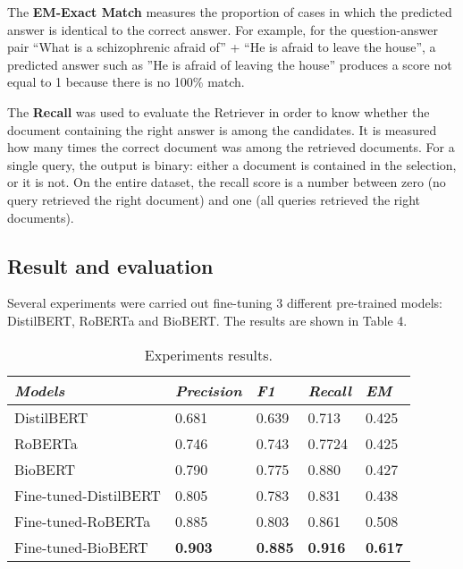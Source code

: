 \documentclass[runningheads]{llncs}
\begin{document}
The \textbf{EM-Exact Match} measures the proportion of cases in which the predicted answer is identical to the correct answer. For example, for the question-answer pair  “What is a schizophrenic afraid of” +  “He is afraid to leave the house”, a predicted answer such as ”He is afraid of leaving the house” produces a score not equal to 1 because there is no 100\% match.


The \textbf{Recall} was used to evaluate the Retriever in order to know whether the document containing the right answer is among the candidates. It is measured how many times the correct document was among the retrieved documents. For a single query, the output is binary: either a document is contained in the selection, or it is not. On the entire dataset, the recall score is a number between zero (no query retrieved the right document) and one (all queries retrieved the right documents). 


\subsection{Result and evaluation}\label{sec:result}

Several experiments were carried out fine-tuning 3 different pre-trained models: DistilBERT, RoBERTa and BioBERT. 
The results are shown in Table 4.

\begin{table}
 \centering
\caption{Experiments results.}\label{tab1}
\begin{tabular}{|l|l|l|l|l|}
\hline
\textit{Models} & \textit{Precision} & \textit{F1} & \textit{Recall} & \textit{EM}\\
\hline
        DistilBERT &  0.681 & 0.639 & 0.713 & 0.425 \\
        RoBERTa &  0.746 & 0.743 & 0.7724 & 0.425 \\
        BioBERT &  0.790 & 0.775 & 0.880 & 0.427 \\
        Fine-tuned-DistilBERT  &  0.805 & 0.783 & 0.831 & 0.438  \\
        Fine-tuned-RoBERTa &  0.885 & 0.803 & 0.861 & 0.508\\
        Fine-tuned-BioBERT &  \textbf{0.903} & \textbf{0.885} &  \textbf{0.916} & \textbf{0.617}  \\
\hline
\end{tabular}
\end{table}
\end{document}
